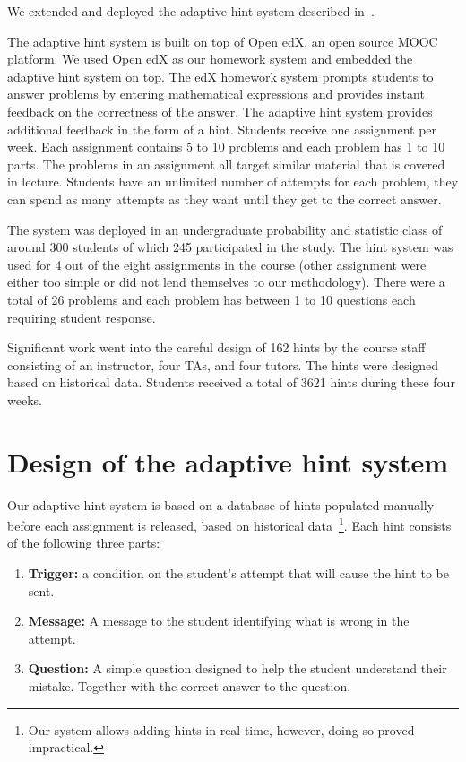 \documentclass{llncs2e/llncs}
\begin{document}
We extended and deployed the adaptive hint system described
in~\cite{ElkherjFreund14}.

The adaptive hint system is built on top of Open edX, an open source
MOOC platform. We used Open edX as our homework system and embedded
the adaptive hint system on top. The edX homework system prompts
students to answer problems by entering mathematical expressions and
provides instant feedback on the correctness of the answer. The
adaptive hint system provides additional feedback in the form of a
hint. Students receive one assignment per week. Each assignment
contains 5 to 10 problems and each problem has 1 to 10 parts. The
problems in an assignment all target similar material that is covered
in lecture. Students have an unlimited number of attempts for each
problem, they can spend as many attempts as they want until they get
to the correct answer.

The system was deployed in an undergraduate probability and statistic
class of around 300 students of which 245 participated in the
study. The hint system was used for 4 out of the eight assignments in
the course (other assignment were either too simple or did not lend
themselves to our methodology). There were a total of 26 problems and
each problem has between 1 to 10 questions each requiring student
response.

Significant work went into the careful design of 162 hints by the
course staff consisting of an instructor, four TAs, and four
tutors. The hints were designed based on historical data. Students
received a total of 3621 hints during these four weeks.

\section*{Design of the adaptive hint system}

Our adaptive hint system is based on a database of hints populated
manually before each assignment is released, based on historical
data~\footnote{Our system allows adding hints in real-time, however,
  doing so proved impractical.}. Each hint consists of the
following three parts:
\begin{enumerate}
\item {\bf Trigger:} a condition on the student's attempt that will
  cause the hint to be sent.
\item {\bf Message:} A message to the student identifying what is
  wrong in the attempt.
\item {\bf Question:} A simple question designed to help the student understand their mistake. Together with the correct answer to the question.   
\end{enumerate}
\end{document}
